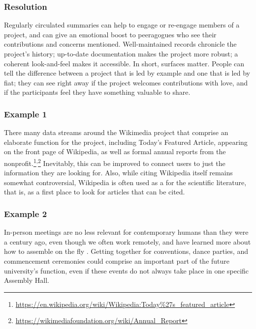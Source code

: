 \subsubsection*{Resolution} 
Regularly circulated summaries can help to engage or re-engage members of a project, and can give an emotional boost to peeragogues who see their contributions and concerns mentioned.  Well-maintained records chronicle the project's history; up-to-date documentation makes the project more robust; a coherent look-and-feel makes it accessible.
%
In short, surfaces matter.  People can tell the difference between a project that is led by example and one that is led by fiat;
they can see right away if the project welcomes contributions with love, and if the participants feel they have something valuable to share.

\subsubsection*{Example 1} 
There many data streams around the Wikimedia project that comprise
an elaborate  function for the project, including
Today's Featured Article, appearing on the front page of
Wikipedia, as well as formal annual reports from the nonprofit.\footnote{\url{https://en.wikipedia.org/wiki/Wikipedia:Today\%27s_featured_article}}\textsuperscript{,}\footnote{\url{https://wikimediafoundation.org/wiki/Annual_Report}}
Inevitably, this can be improved to connect users to just the
information they are looking for.  Also, while citing Wikipedia itself
remains somewhat controversial, Wikipedia is often used as a
 for the scientific literature, that is, as a
first place to look for articles that can be cited.

\subsubsection*{Example 2} In-person meetings are no less relevant
for contemporary humans than they were a century ago, even though we
often work remotely, and have learned more about how to assemble on the fly
\cite{rheingold2007smart}.  Getting together for conventions, dance
parties, and commencement ceremonies could comprise an important part
of the future university's  function, even if
these events do not always take place in one specific Assembly Hall.



